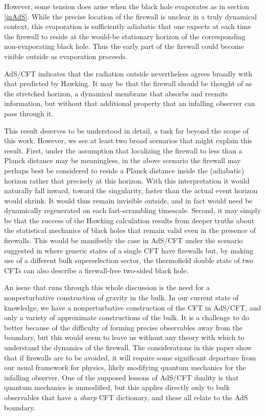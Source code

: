 \documentclass[12pt]{article}
\begin{document}
However, some tension does arise when the black hole evaporates as in section \ref{inAdS}.  While the precise location of the firewall is unclear in a truly dynamical context, this evaporation is sufficiently adiabatic that one expects at each time the firewall to reside at the would-be stationary horizon of the corresponding non-evaporating black hole.  Thus the early part of the firewall could become visible outside as evaporation proceeds.

AdS/CFT indicates that the radiation outside nevertheless agrees broadly with that predicted by Hawking.  {It may be that the firewall should be thought of as the stretched horizon, a dynamical membrane that absorbs and reemits information, but without that additional property that an infalling observer can pass through it.}

This result deserves to be understood in detail, a task far beyond the scope of this work.  However, we see at least two broad scenarios that might explain this result.  First, under the assumption that localizing the firewall to less than a Planck distance may be meaningless, in the above scenario the firewall may perhaps best be considered to reside a Planck distance inside the (adiabatic) horizon rather that precisely at this horizon.  With this interpretation it would naturally fall inward, toward the singularity, faster than the actual event horizon would shrink.  It would thus remain invisible outside, and in fact would need be dynamically regenerated on each fast-scrambling timescale.  Second, it may simply be that the success of the Hawking calculation results from deeper truths about the statistical mechanics of black holes that remain valid even in the presence of firewalls.  {This would be manifestly the case in AdS/CFT under the scenario suggested in \cite{Marolf:2012xe} where generic states of a single CFT have firewalls but, by making use of a different bulk superselection sector, the thermofield double state of two CFTs can also describe a firewall-free two-sided black hole.}

An issue that runs through this whole discussion is the need for a nonperturbative construction of gravity in the bulk.  In our current state of knowledge, we have a nonperturbative construction of the CFT in AdS/CFT, and only a variety of approximate constructions of the bulk.  It is a challenge to do better because of the difficulty of forming precise observables away from the boundary, but this would seem to leave us without any theory with which to understand the dynamics of the firewall.  The considerations in this paper show that if firewalls are to be avoided, it will require some significant departure from our usual framework for physics, likely modifying quantum mechanics for the infalling observer.  One of the supposed lessons of AdS/CFT duality is that quantum mechanics is unmodified, but this applies directly only to bulk observables that have a {\it sharp} CFT dictionary, and these all relate to the AdS boundary.
\end{document}
